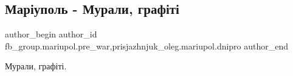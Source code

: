  
 
 
 
 

\subsection{Маріуполь - Мурали, графіті}
\label{sec:20_01_2023.fb.fb_group.mariupol.pre_war.4.mar_upol___murali__g}
 
\ifcmt
 author_begin
   author_id fb_group.mariupol.pre_war,prisjazhnjuk_oleg.mariupol.dnipro
 author_end
\fi

Мурали, графіті.

